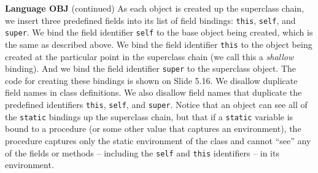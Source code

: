 \begin{minipage}[t]{\sw}
\slidenumber
\LARGE
{\bf Language OBJ} (continued)\exx
As each object is created up the superclass chain,
we insert three predefined fields
into its list of field bindings:
\verb'this', \verb'self', and \verb'super'.
We bind the field identifier \verb'self'
to the base object being created,
which is the same as described above.
We bind the field identifier \verb'this'
to the object being created at the particular point
in the superclass chain (we call this a {\em shallow} binding).
And we bind the field identifier \verb'super'
to the superclass object.
The code for creating these bindings is shown on Slide 5.16.\exx
We disallow duplicate field names in class definitions.
We also disallow field names that duplicate the predefined identifiers
\verb'this', \verb'self', and \verb'super'.\exx
Notice that an object can see all
of the \verb'static' bindings up the superclass chain,
but that if a \verb'static' variable is bound to a procedure
(or some other value that captures an environment),
the procedure captures only the static environment of the class
and cannot ``see'' any of the fields or methods --
including the \verb'self' and \verb'this' identifiers --
in its environment.
\end{minipage}
